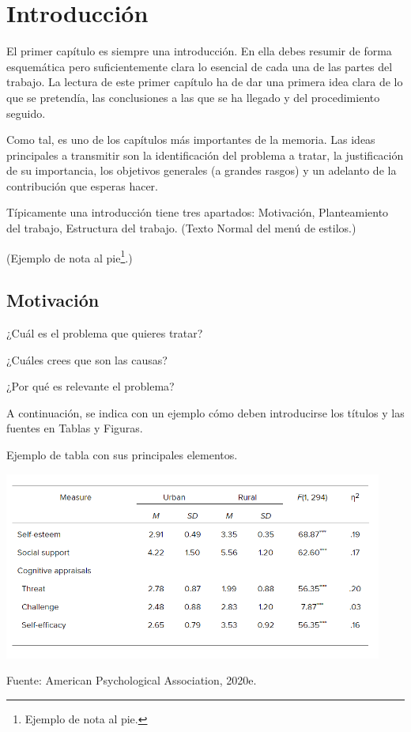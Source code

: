\chapter{Introducción}

El primer capítulo es siempre una introducción. En ella debes resumir de forma esquemática pero suficientemente clara lo esencial de cada una de las partes del trabajo. La lectura de este primer capítulo ha de dar una primera idea clara de lo que se pretendía, las conclusiones a las que se ha llegado y del procedimiento seguido.

Como tal, es uno de los capítulos más importantes de la memoria. Las ideas principales a transmitir son la identificación del problema a tratar, la justificación de su importancia, los objetivos generales (a grandes rasgos) y un adelanto de la contribución que esperas hacer.

Típicamente una introducción tiene tres apartados: Motivación, Planteamiento del trabajo, Estructura del trabajo. (Texto Normal del menú de estilos.)

(Ejemplo de nota al pie\footnote{Ejemplo de nota al pie.}.)

\section{Motivación}

¿Cuál es el problema que quieres tratar?

¿Cuáles crees que son las causas?

¿Por qué es relevante el problema?

A continuación, se indica con un ejemplo cómo deben introducirse los títulos y las fuentes en Tablas y Figuras.

\begin{table}[t]
	\begin{center}
	\caption{Ejemplo de tabla con sus principales elementos.}
	\label{tab:1}
	\includegraphics[width=4.90737in,height=2.42708in]{tabla}

	\small Fuente: American Psychological Association, 2020e.
	\end{center}
\end{table}

